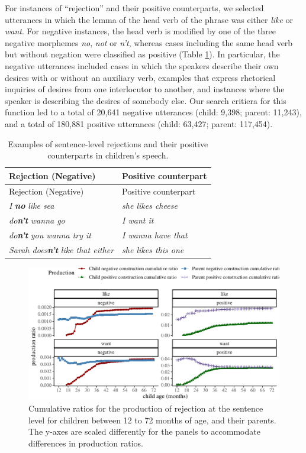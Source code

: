 \documentclass[
  man,floatsintext]{apa6}
\begin{document}
For instances of ``rejection'' and their positive counterparts, we selected utterances in which the lemma of the head verb of the phrase was either \emph{like} or \emph{want}. For negative instances, the head verb is modified by one of the three negative morphemes \emph{no}, \emph{not} or \emph{n't}, whereas cases including the same head verb but without negation were classified as positive (Table \ref{tab:rejection}). In particular, the negative utterances included cases in which the speakers describe their own desires with or without an auxiliary verb, examples that express rhetorical inquiries of desires from one interlocutor to another, and instances where the speaker is describing the desires of somebody else. Our search critiera for this function led to a total of 20,641 negative utterances (child: 9,398; parent: 11,243), and a total of 180,881 positive utterances (child: 63,427; parent: 117,454).

\begin{longtable}[]{@{}ll@{}}
\caption{\label{tab:rejection} Examples of sentence-level rejections and their positive counterparts in children's speech.}\tabularnewline
\toprule\noalign{}
Rejection (Negative) & Positive counterpart \\
\midrule\noalign{}
\endfirsthead
\toprule\noalign{}
Rejection (Negative) & Positive counterpart \\
\midrule\noalign{}
\endhead
\bottomrule\noalign{}
\endlastfoot
\emph{I} \textbf{\emph{no}} \emph{like sea} & \emph{she likes cheese} \\
\emph{do\textbf{n't}} \emph{wanna go} & \emph{I want it} \\
\emph{do\textbf{n't}} \emph{you wanna try it} & \emph{I wanna have that} \\
\emph{Sarah does\textbf{n't}} \emph{like that either} & \emph{she likes this one} \\
\end{longtable}

\begin{figure}[H]

{\centering \includegraphics{neg_construction_article_files/figure-latex/emotion-1} 

}

\caption{Cumulative ratios for the production of rejection at the sentence level for children between 12 to 72 months of age, and their parents. The y-axes are scaled differently for the panels to accommodate differences in production ratios.}\label{fig:emotion}
\end{figure}
\end{document}
